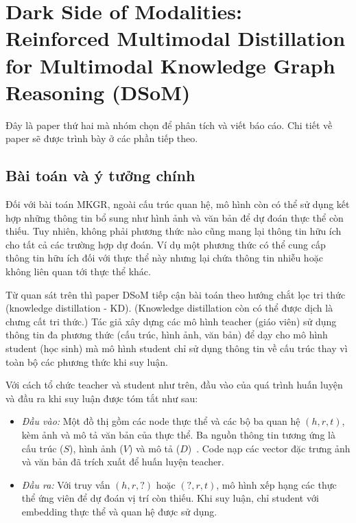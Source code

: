 \section{Dark Side of Modalities: Reinforced Multimodal Distillation for Multimodal Knowledge Graph Reasoning (DSoM)}

Đây là paper thứ hai mà nhóm chọn để phân tích và viết báo cáo. Chi tiết về paper sẽ được trình bày ở các phần tiếp theo.

\subsection{Bài toán và ý tưởng chính}

Đối với bài toán MKGR, ngoài cấu trúc quan hệ, mô hình còn có thể sử dụng kết hợp những thông tin bổ sung như hình ảnh và văn bản để dự đoán thực thể còn thiếu.
Tuy nhiên, không phải phương thức nào cũng mang lại thông tin hữu ích cho tất cả các trường hợp dự đoán.
Ví dụ một phương thức có thể cung cấp thông tin hữu ích đối với thực thể này nhưng lại chứa thông tin nhiễu hoặc không liên quan tới thực thể khác.

Từ quan sát trên thì paper DSoM tiếp cận bài toán theo hướng chắt lọc tri thức (knowledge distillation - KD). (Knowledge distillation còn có thể được dịch là chưng cất tri thức.) Tác giả xây dựng các mô hình teacher (giáo viên) sử dụng thông tin đa phương thức (cấu trúc, hình ảnh, văn bản) để dạy cho mô hình student (học sinh) mà mô hình student chỉ sử dụng thông tin về cấu trúc thay vì toàn bộ các phương thức khi suy luận.

Với cách tổ chức teacher và student như trên, đầu vào của
quá trình huấn luyện và đầu ra khi suy luận được tóm tắt như sau:
\begin{itemize}
    \item \textit{Đầu vào:} Một đồ thị gồm các node thực thể và
    các bộ ba quan hệ $(h,r,t)$, kèm ảnh và mô tả văn bản của
    thực thể. Ba nguồn thông tin tương ứng là cấu trúc ($S$),
    hình ảnh ($V$) và mô tả ($D$)~\cite{10.1145/3746027.3754576}.
    Code nạp các vector đặc trưng ảnh và văn bản đã trích xuất
    để huấn luyện teacher.

    \item \textit{Đầu ra:} Với truy vấn $(h,r,?)$ hoặc $(?,r,t)$,
    mô hình xếp hạng các thực thể ứng viên để dự đoán vị trí
    còn thiếu. Khi suy luận, chỉ student với embedding thực thể
    và quan hệ được sử dụng.
\end{itemize}

